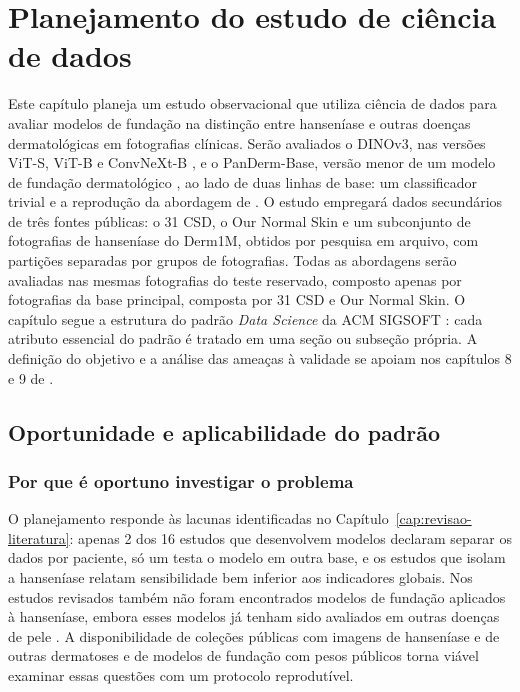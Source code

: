 \chapter{Planejamento do estudo de ciência de dados}
\label{cap:metodologia-experimental}
\begingroup
\raggedbottom

Este capítulo planeja um estudo observacional que utiliza ciência de
dados para avaliar modelos de fundação na distinção entre hanseníase e
outras doenças dermatológicas em fotografias clínicas. Serão avaliados o
DINOv3, nas versões ViT-S, ViT-B e ConvNeXt-B \cite{simeoni2025dinov3}, e o
PanDerm-Base, versão menor de um modelo de fundação dermatológico
\cite{yan2025panderm}, ao lado
de duas linhas de base: um classificador trivial e a reprodução da
abordagem de . O estudo empregará dados
secundários de três fontes públicas: o 31 CSD, o Our Normal Skin e um
subconjunto de fotografias de hanseníase do Derm1M, obtidos por pesquisa em arquivo, com
partições separadas por grupos de fotografias. Todas as abordagens serão
avaliadas nas mesmas fotografias do teste reservado, composto apenas por
fotografias da base principal, composta por 31 CSD e Our Normal Skin.
O capítulo segue a estrutura do padrão \textit{Data Science} da ACM
SIGSOFT \cite{acmSigsoftDataScience}: cada atributo essencial do padrão é
tratado em uma seção ou subseção própria. A definição do objetivo e a
análise das ameaças à validade se apoiam nos capítulos 8 e 9 de
.

\section{Oportunidade e aplicabilidade do padrão}
\label{sec:oportunidade-aplicabilidade}

\subsection{Por que é oportuno investigar o problema}
\label{subsec:oportunidade}

O planejamento responde às lacunas identificadas no
Capítulo~\ref{cap:revisao-literatura}: apenas 2 dos 16 estudos que
desenvolvem modelos declaram separar os dados por paciente, só um testa o
modelo em outra base, e os estudos que isolam a hanseníase relatam
sensibilidade bem inferior aos indicadores globais. Nos estudos revisados
também não foram encontrados modelos de fundação aplicados à hanseníase,
embora esses modelos já tenham sido avaliados em outras doenças de pele
\cite{yan2025panderm}. A disponibilidade de coleções públicas com imagens de
hanseníase e de outras dermatoses e de modelos de fundação com pesos
públicos torna viável examinar essas questões com um protocolo
reprodutível.

